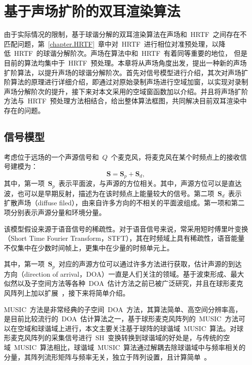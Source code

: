 \chapter{基于声场扩阶的双耳渲染算法 }\label{chapter.AddWindow}

由于实际情况的限制，基于球谐分解的双耳渲染算法在声场和~HRTF~之间存在不匹配问题，第~\ref{chapter.HRTF}~章中对~HRTF~进行相位对准预处理，以降低~HRTF~的球谐分解阶次。声场在算法中和~HRTF~有着同等重要的地位， 但是目前的算法均集中于~HRTF~预处理。本章将从声场角度出发，提出一种新的声场扩阶算法，以提升声场的球谐分解阶次。首先对信号模型进行介绍，其次对声场扩阶算法的原理进行详细介绍，即通过对原始录制声场进行空域加窗，以实现对录制声场分解阶次的提升，接下来对本文采用的空域窗函数加以介绍。并且将声场扩阶方法与~HRTF~预处理方法相结合，给出整体算法框图，共同解决目前双耳渲染中存在的问题。

\section{信号模型}\label{sec.modelAndMusic}

考虑位于远场的一个声源信号和~$Q$~个麦克风，将麦克风在某个时频点上的接收信号建模为：
\begin{equation}\label{eq.model}
\bm{S} = \bm{S}_{p} + \bm{S}_{d},
\end{equation}
其中，第一项~$\bm{S}_{p}$~表示平面波，与声源的方位相关。其中，声源方位可以是直达波，也可以是早期反射，描述为在该时频点上能量较大的信号。第二项~$\bm{S}_{d}$~表示扩散声场（diffuse filed），由来自许多方向的不相关的平面波组成。第一项和第二项分别表示声源分量和环境分量。

该模型假设来源于语音信号的稀疏性。对于语音信号来说，常采用短时傅里叶变换（Short Time Fourier Transform，STFT），其在时频域上具有稀疏性，语音能量不仅集中在少数时间帧上，更集中在少量的时频单元上。

其中，第一项~$\bm{S}_{p}$~对应的声源方位可以通过许多方法进行获取，估计声源的到达方向（direction of arrival，DOA）一直是人们关注的领域。基于波束形成、最大似然以及子空间方法等各种~DOA~估计方法之前已被广泛研究，并且在球形麦克风阵列上加以扩展~，接下来将简单介绍。

MUSIC~方法是非常经典的子空间~DOA~方法，其算法简单、高空间分辨率高，是目前比较流行的~DOA~估计算法之一，基于球形麦克风阵列的~MUSIC~方法可以在空域和球谐域上进行，本文主要关注基于球阵的球谐域~MUSIC~算法。对球形麦克风阵列的采集信号进行~SH~变换转换到球谐域的好处是，与传统的空域~MUSIC~算法相比，球谐域~MUSIC~算法通过解耦去除球谐域中与频率相关的分量，其阵列流形矩阵与频率无关，独立于阵列设置，且计算简单~。


